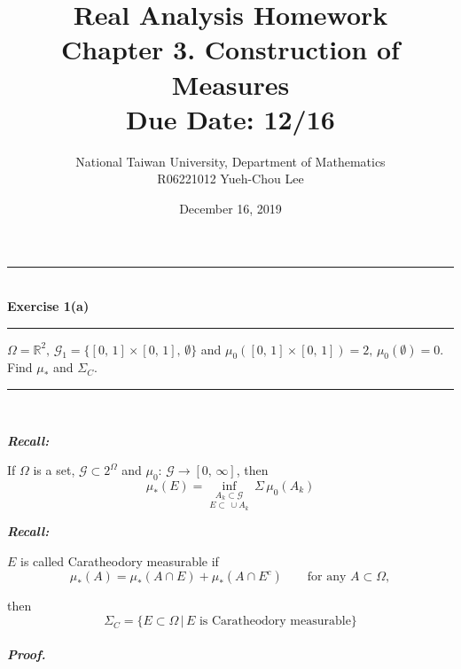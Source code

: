 \documentclass[a4paper,11pt]{article}
\title{Real Analysis Homework\\ Chapter 3. Construction of Measures\\ Due Date: 12/16}
\author{National Taiwan University, Department of Mathematics\\
R06221012 \hspace{0.2cm} Yueh-Chou Lee}
\date{December 16, 2019}
\begin{document}
\maketitle


\begin{flushleft}
	\rule[-0.5ex]{17cm}{2pt}\\
		\textbf{Exercise 1(a)}\\
	\rule[1.5ex]{17cm}{0.5pt}
		$\Omega = \mathbb{R}^2,\,\mathcal{G}_1 = \{[0,\,1] \times [0,\,1],\,\emptyset\}$ and $\mu_0([0,\,1]\times[0,\,1]) = 2,\,\mu_0(\emptyset) = 0$. Find $\mu_*$ and $\Sigma_C$.
	\rule[1.0ex]{17cm}{0.5pt}\
\end{flushleft}

\textbf{\textit{Recall:}}

If $\Omega$ is a set, $\mathcal{G} \subset 2^\Omega$ and $\mu_0:\,\mathcal{G} \to [0,\,\infty]$, then
	$$\mu_*(E) = \underset{E \subset\,\cup A_k}{\underset{A_k \subset \mathcal{G}}{\inf}}\,\Sigma\,\mu_0(A_k)$$

\textbf{\textit{Recall:}}

$E$ is called Caratheodory measurable if
	$$\mu_*(A) = \mu_*(A \cap E) + \mu_*(A \cap E^c)
	\quad \quad \text{for any }A \subset \Omega,$$

then
	$$\Sigma_C = \{E \subset \Omega\,|\,E \text{ is Caratheodory measurable}\}$$\\

\textbf{\textit{Proof.}}
\end{document}

